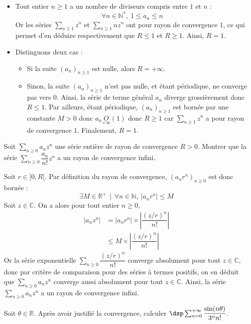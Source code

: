 \documentclass[a4paper,10pt]{report}
\newcommand{\Sum}[2]{\ensuremath{\textstyle{\sum\limits_{#1}^{#2}}}}
\begin{document}
\corr 
\begin{itemize}
\item Tout entier $n\geq 1$ a un nombre de diviseurs compris entre $1$ et $n$ :
\[
\forall n\in\mathbb{N}^*,\ 1\leq a_n \leq n
\]
Or les séries $\Sum{n\geq 1}{} z^n$ et $\Sum{n\geq 1}{}n z^n$ ont pour rayon de convergence $1$, ce qui permet d'en déduire respectivement que $R\leq 1$ et $R\geq 1$.  Ainsi, $R=1$.
\item Distinguons deux cas :
\begin{itemize}
\item Si la suite $(a_n)_{n\geq 1}$ est nulle, alors $R=+\infty$.
\item Sinon, la suite $(a_n)_{n\geq 1}$ n'est pas nulle, et étant périodique, ne converge pas vers $0$. Ainsi, la série de terme général $a_n$ diverge grossièrement donc $R\leq 1$. Par ailleurs, étant périodique, $(a_n)_{n\geq 1}$ est bornée par une constante $M>0$ donc $a_n \underset{+ \infty} O(1)$ donc $R \geq 1$ car $\Sum{n\geq 1}{} z^n$ a pour rayon de convergence $1$. Finalement, $R=1$.
\end{itemize}
\end{itemize}

\begin{Exercice}{} Soit $\Sum{n \geq 0}{} a_n z^n$ une série entière de rayon de convergence $R>0$. Montrer que  la série $\Sum{n \geq 0}{} \dfrac{a_n}{n!}z^n$ a un rayon de convergence infini. 
\end{Exercice}

\corr Soit $r\in ]0,R[$. Par définition du rayon de convergence, $(a_n r^n)_{n \geq 0}$ est donc bornée : 
\[
\exists M\in\mathbb{R}^+\,\mid\, \forall n\in\mathbb{N},\ \vert a_n r^n\vert \leq M
\]
Soit $z\in\mathbb{C}$. On a alors pour tout entier $n \geq 0$,
\begin{align*}
\vert a_n z^n\vert & =\vert a_n r^n\vert \times \left\vert\dfrac{(z/r)^n}{n!}\right\vert \\
&  \leq M\times \left\vert\dfrac{(z/r)^n}{n!}\right\vert
\end{align*}
Or la série exponentielle $\Sum{n \geq 0}{} \dfrac{(z/r)^n}{n!}$ converge absolument pour tout $z\in\mathbb{C}$, donc par critère de comparaison pour des séries à termes positifs, on en déduit que $\Sum{n \geq 0}{} a_nz^n$ converge aussi absolument pour tout $z\in\mathbb{C}$. Ainsi, la série $\Sum{n \geq 0}{} a_nz^n$ a un rayon de convergence infini.


\begin{Exercice}{} Soit $\theta\in\mathbb{R}$. Après avoir justifié la convergence, calculer $\dsp\sum_{n=0}^{+\infty}\dfrac{\sin(n\theta)}{3^nn!}$.
\end{Exercice}
\end{document}
